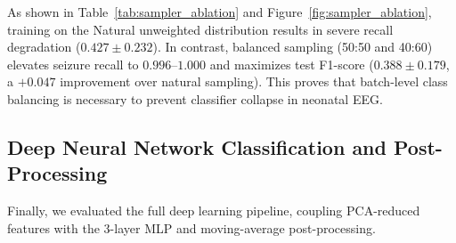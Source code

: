 \documentclass[10pt,twocolumn,letterpaper]{article}
\begin{document}
As shown in Table~\ref{tab:sampler_ablation} and Figure~\ref{fig:sampler_ablation}, training on the Natural unweighted distribution results in severe recall degradation ($0.427 \pm 0.232$). In contrast, balanced sampling (50:50 and 40:60) elevates seizure recall to $0.996$--$1.000$ and maximizes test F1-score ($0.388 \pm 0.179$, a $+0.047$ improvement over natural sampling). This proves that batch-level class balancing is necessary to prevent classifier collapse in neonatal EEG.

\subsection{Deep Neural Network Classification and Post-Processing}\label{subsec:nn_results}

Finally, we evaluated the full deep learning pipeline, coupling PCA-reduced features with the 3-layer MLP and moving-average post-processing. 

\begin{table}[h!]
\centering
\caption{\textbf{Deep MLP Performance Benchmark (Top 5 Trials Ranked by Validation Accuracy).}}\label{tab:deep_mlp}
\end{table}
\end{document}
